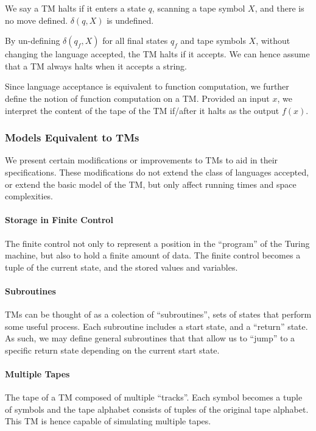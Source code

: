 \begin{definition}[Halting]
  We say a TM halts if it enters a state $q$, scanning a tape symbol $X$, and there
  is no move defined. $\delta\left( q,X \right)$ is undefined.
\end{definition}

\begin{remark}
  By un-defining $\delta\left( q_f, X \right)$ for all final states $q_f$ and
  tape symbols $X$, without changing the language accepted, the TM halts if it
  accepts. We can hence assume that a TM always halts when it accepts a string.
\end{remark}

Since language acceptance is equivalent to function computation, we further
define the notion of function computation on a TM. Provided an input $x$, we
interpret the content of the tape of the TM if/after it halts as the output
$f(x)$.

\subsubsection{Models Equivalent to TMs}
We present certain modifications or improvements to TMs to aid in their
specifications. These modifications do not extend the class of languages
accepted, or extend the basic model of the TM, but only affect running times
and space complexities.

\paragraph{Storage in Finite Control} The finite control not only to represent
a position in the ``program'' of the Turing machine, but also to hold a finite
amount of data. The finite control becomes a tuple of the current state, and
the stored values and variables.

\paragraph{Subroutines} TMs can be thought of as a colection of
``subroutines'', sets of states that perform some useful process. Each
subroutine includes a start state, and a ``return'' state. As such, we may
define general subroutines that that allow us to ``jump'' to a specific return
state depending on the current start state.

\paragraph{Multiple Tapes} The tape of a TM composed of multiple ``tracks''.
Each symbol becomes a tuple of symbols and the tape alphabet consists of tuples
of the original tape alphabet. This TM is hence capable of simulating multiple
tapes.

